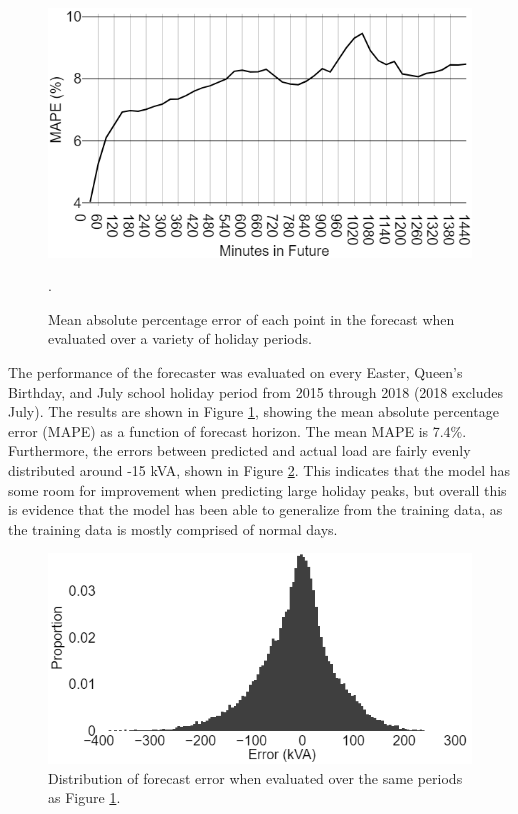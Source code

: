 \begin{figure}[htbp]
	\centerline{\includegraphics[width=.65\textwidth]{images/bruny_mape.png}}
	\caption{Mean absolute percentage error of each point in the forecast when evaluated over a variety of holiday periods.}.
	
	\label{fig:bruny_mape}
\end{figure}

The performance of the forecaster was evaluated on every Easter, Queen's Birthday, and July school holiday period from 2015 through 2018 (2018 excludes July).
The results are shown in Figure \ref{fig:bruny_mape}, showing the mean absolute percentage error (MAPE) as a function of forecast horizon.
The mean MAPE is 7.4\%.
Furthermore, the errors between predicted and actual load are fairly evenly distributed around -15 kVA, shown in Figure \ref{fig:bruny_hist}.
This indicates that the model has some room for improvement when predicting large holiday peaks, but overall this is evidence that the model has been able to generalize from the training data, as the training data is mostly comprised of normal days.

\begin{figure}[htbp]
	\centerline{\includegraphics[width=.65\textwidth]{images/errors_histogram.png}}
	\caption{Distribution of forecast error when evaluated over the same periods as Figure \ref{fig:bruny_mape}.}
	\label{fig:bruny_hist}
\end{figure}


